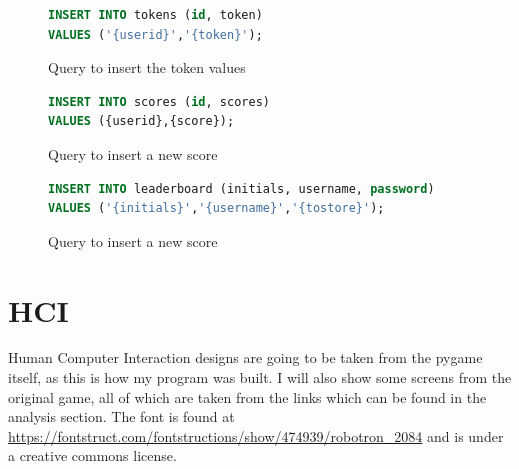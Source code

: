 \begin{figure}[H]
    \begin{lstlisting}[language=SQL, style=mystyle1]
INSERT INTO tokens (id, token)
VALUES ('{userid}','{token}');
    \end{lstlisting}
      \centering
      \caption{Query to insert the token values}
      \label{fig:SQL6}
\end{figure}

\begin{figure}[H]
    \begin{lstlisting}[language=SQL, style=mystyle1]
INSERT INTO scores (id, scores)
VALUES ({userid},{score});
    \end{lstlisting}
      \centering
      \caption{Query to insert a new score}
      \label{fig:SQL7}
\end{figure}

\begin{figure}[H]
    \begin{lstlisting}[language=SQL, style=mystyle1]
INSERT INTO leaderboard (initials, username, password)
VALUES ('{initials}','{username}','{tostore}');
    \end{lstlisting}
      \centering
      \caption{Query to insert a new score}
      \label{fig:SQL8}
\end{figure}



\section{HCI}
Human Computer Interaction designs are going to be taken from the pygame itself, as this is how my program was built. I will also show some screens from the original game, all of which are taken from the links which can be found in the analysis section. The font is found at \url{https://fontstruct.com/fontstructions/show/474939/robotron_2084} and is under a creative commons license.

